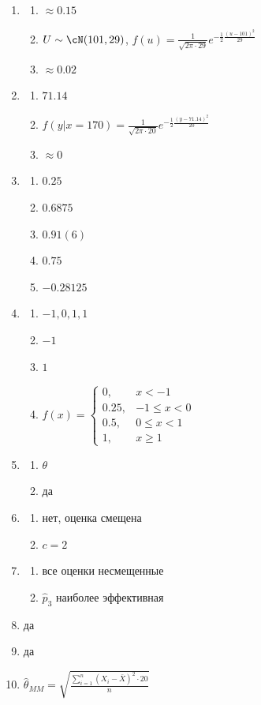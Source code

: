 \begin{enumerate}
\item
\begin{enumerate}
\item $\approx 0.15$
\item $U \sim \cN(101,29)$, $f(u) = \frac{1}{\sqrt{2\pi\cdot 29}}e^{-\frac{1}{2}\frac{(u-101)^2}{29}}$
\item $\approx 0.02$
\end{enumerate}
\item
\begin{enumerate}
\item $71.14$
\item $f(y|x=170) = \frac{1}{\sqrt{2\pi\cdot20}}e^{-\frac{1}{2}\frac{(y-71.14)^2}{20}}$
\item $\approx 0$
\end{enumerate}
\item
\begin{enumerate}
\item $0.25$
\item $0.6875$
\item $0.91(6)$
\item $0.75$
\item $-0.28125$
\end{enumerate}
\item
\begin{enumerate}
\item $-1, 0, 1, 1$
\item $-1$
\item $1$
\item $f(x) = \begin{cases}
0, & x < -1 \\
0.25, & -1 \leq x < 0 \\
0.5, & 0 \leq x < 1 \\
1, & x \geq 1
\end{cases}$
\end{enumerate}
\item
\begin{enumerate}
\item $\theta$
\item да
\end{enumerate}

\item
\begin{enumerate}
\item нет, оценка смещена
\item $c = 2$
\end{enumerate}
\item
\begin{enumerate}
\item все оценки несмещенные
\item $\hat{p}_3$ наиболее эффективная
\end{enumerate}
\item да
\item да
\item $\hat{\theta}_{MM} = \sqrt{\frac{\sum_{i=1}^n(X_i-\bar X)^2\cdot20}{n}}$


\end{enumerate}
